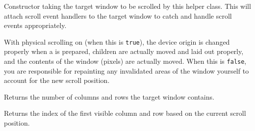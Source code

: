 

\label{wxvarhvscrollhelperwxvarhvscrollhelper}


Constructor taking the target window to be scrolled by this helper class.
This will attach scroll event handlers to the target window to catch and
handle scroll events appropriately.


\label{wxvarhvscrollhelperenablephysicalscrolling}


With physical scrolling on (when this is {\tt true}), the device origin is
changed properly when a \rtfsp{} is prepared,
children are actually moved and laid out properly, and the contents of the
window (pixels) are actually moved. When this is {\tt false}, you are
responsible for repainting any invalidated areas of the window yourself to
account for the new scroll position.





\label{wxvarhvscrollhelpergetrowcolumncount}


Returns the number of columns and rows the target window contains.




\label{wxvarhvscrollhelpergetvisiblebegin}


Returns the index of the first visible column and row based on the current
scroll position.


\label{wxvarhvscrollhelpergetvisibleend}

